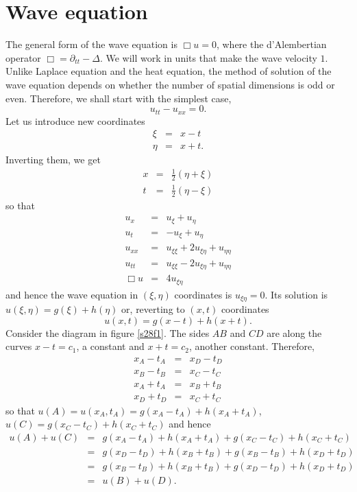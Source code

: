 \documentclass{article}
\theoremstyle{plain}
\numberwithin{thm}{section}
\theoremstyle{plain}
\numberwithin{prop}{section}
\theoremstyle{definition}
\numberwithin{defn}{section}
\theoremstyle{remark}
\numberwithin{equation}{section}
\begin{document}
\section{Wave equation}\label{s28}
The general form of the wave equation is $\Box u = 0$, where the d'Alembertian operator $\Box = \partial_{tt} - 
\Delta$. We will work in units that make the wave velocity $1$. Unlike Laplace equation and the heat equation,
the method of solution of the wave equation depends on whether the number of spatial dimensions is odd or even.
Therefore, we shall start with the simplest case, 
\begin{equation}\label{s28e1}
u_{tt} - u_{xx} = 0.
\end{equation}
Let us introduce new coordinates
\begin{eqnarray*}
\xi &=& x - t \\
\eta &=& x + t.
\end{eqnarray*}
Inverting them, we get
\begin{eqnarray*}
x &=& \frac{1}{2}(\eta + \xi) \\
t &=& \frac{1}{2}(\eta - \xi)
\end{eqnarray*}
so that
\begin{eqnarray*}
u_x &=& u_{\xi} + u_{\eta} \\
u_t &=& -u_{\xi} + u_{\eta} \\
u_{xx} &=& u_{\xi\xi} + 2u_{\xi\eta} + u_{\eta\eta} \\
u_{tt} &=& u_{\xi\xi} - 2u_{\xi\eta} + u_{\eta\eta} \\
\Box u &=& 4u_{\xi\eta}
\end{eqnarray*}
and hence the wave equation in $(\xi, \eta)$ coordinates is $u_{\xi\eta} = 0$. Its solution is $u(\xi, \eta) = 
g(\xi) + h(\eta)$ or, reverting to $(x, t)$ coordinates
\begin{equation}\label{s28e2}
u(x, t) = g(x - t) + h(x + t).
\end{equation}
Consider the diagram in figure \ref{s28f1}. The sides $AB$ and $CD$ are along the curves $x - t = c_1$, a constant
and $x + t = c_2$, another constant. Therefore,
\begin{eqnarray*}
x_A - t_A &=& x_D - t_D \\
x_B - t_B &=& x_C - t_C \\
x_A + t_A &=& x_B + t_B \\
x_D + t_D &=& x_C + t_C
\end{eqnarray*}
so that $u(A) = u(x_A, t_A) = g(x_A - t_A) + h(x_A + t_A)$, $u(C) = g(x_C - t_C) + h(x_C + t_C)$ and hence
\begin{eqnarray}
u(A) + u(C) &=& g(x_A - t_A) + h(x_A + t_A) + g(x_C - t_C) + h(x_C + t_C) \nonumber \\
 &=& g(x_D - t_D) + h(x_B + t_B) + g(x_B - t_B) + h(x_D + t_D) \nonumber \\
 &=& g(x_B - t_B) + h(x_B + t_B) + g(x_D - t_D) + h(x_D + t_D) \nonumber \\
 &=& u(B) + u(D). \label{s28e3}
\end{eqnarray}
\end{document}
